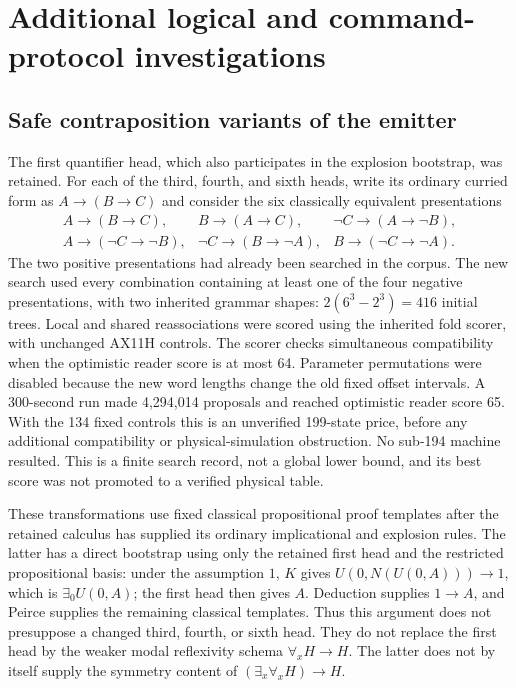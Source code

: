 \section{Additional logical and command-protocol investigations}
\subsection{Safe contraposition variants of the emitter}
The first quantifier head, which also participates in the explosion
bootstrap, was retained. For each of the third, fourth, and sixth heads,
write its ordinary curried form as $A\to(B\to C)$ and consider the six
classically equivalent presentations
\[
\begin{array}{lll}
A\to(B\to C),&B\to(A\to C),&\neg C\to(A\to\neg B),\\
A\to(\neg C\to\neg B),&\neg C\to(B\to\neg A),&B\to(\neg C\to\neg A).
\end{array}
\]
The two positive presentations had already been searched in the corpus.
The new search used every combination containing at least one of the
four negative presentations, with two inherited grammar shapes:
$2(6^3-2^3)=416$ initial trees.  Local and shared reassociations were
scored using the inherited fold scorer, with unchanged
AX11H controls. The scorer checks simultaneous compatibility when the
optimistic reader score is at most 64. Parameter permutations were disabled because the new
word lengths change the old fixed offset intervals. A 300-second run
made 4,294,014 proposals and reached optimistic reader score 65. With the
134 fixed controls this is an unverified 199-state price, before any
additional compatibility or physical-simulation obstruction. No sub-194
machine resulted. This is a finite search record, not a global lower
bound, and its best score was not promoted to a verified physical table.

These transformations use fixed classical propositional proof templates
after the retained calculus has supplied its ordinary implicational and
explosion rules. The latter has a direct bootstrap using only the
retained first head and the restricted propositional basis: under the
assumption $1$, $K$ gives
$U(0,N(U(0,A)))\to1$, which is $\exists_0 U(0,A)$;
the first head then gives $A$. Deduction supplies $1\to A$, and Peirce
supplies the remaining classical templates. Thus this argument does
not presuppose a changed third, fourth, or sixth head. They do not replace the first head by the weaker modal
reflexivity schema $\forall_x H\to H$. The latter does not by itself
supply the symmetry content of $(\exists_x\forall_xH)\to H$.

